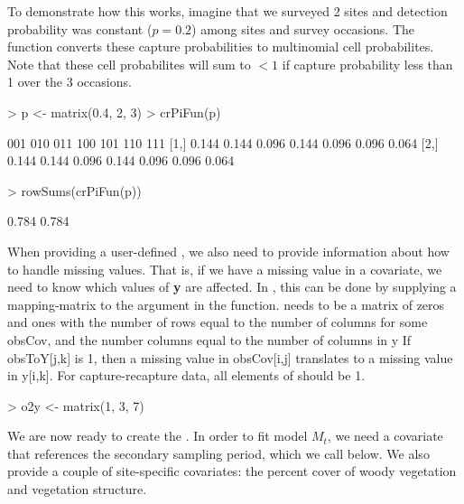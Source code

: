 \documentclass[a4paper]{article}
\renewenvironment{Schunk}{\vspace{\topsep}}{\vspace{\topsep}}
\begin{document}
To demonstrate how this works, imagine that we surveyed 2 sites and
detection probability was constant ($p=0.2$) among sites and survey
occasions. The function converts these capture probabilities to
multinomial cell probabilites. Note that these cell probabilites will
sum to $< 1$ if capture probability less than 1 over the 3 occasions.

\begin{Schunk}
\begin{Sinput}
> p <- matrix(0.4, 2, 3)
> crPiFun(p)
\end{Sinput}
\begin{Soutput}
       001   010   011   100   101   110   111
[1,] 0.144 0.144 0.096 0.144 0.096 0.096 0.064
[2,] 0.144 0.144 0.096 0.144 0.096 0.096 0.064
\end{Soutput}
\begin{Sinput}
> rowSums(crPiFun(p))
\end{Sinput}
\begin{Soutput}
[1] 0.784 0.784
\end{Soutput}
\end{Schunk}




When providing a user-defined , we also need to provide
information about how to handle missing values. That is, if we have a
missing value in a covariate, we need to know which values of {\bf y}
are affected. In , this can be done by supplying a
mapping-matrix to the  argument in the
 function.  needs to be a matrix
of zeros and ones with
the number of rows equal to the number of columns for some obsCov, and
the number columns equal to the number of columns in y
If obsToY[j,k] is 1, then a missing value in obsCov[i,j] translates to
a missing value in y[i,k]. For capture-recapture data, all elements of
 should be 1.

\begin{Schunk}
\begin{Sinput}
> o2y <- matrix(1, 3, 7)
\end{Sinput}
\end{Schunk}

We are now ready to create the . In order to fit
model $M_t$, we need a covariate that references the secondary sampling
period, which we call  below. We also provide a
couple of site-specific covariates: the percent cover of woody
vegetation and vegetation structure.
\end{document}
